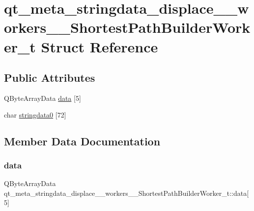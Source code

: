 \hypertarget{structqt__meta__stringdata__displace____workers_____shortest_path_builder_worker__t}{}\section{qt\+\_\+meta\+\_\+stringdata\+\_\+displace\+\_\+\+\_\+workers\+\_\+\+\_\+\+Shortest\+Path\+Builder\+Worker\+\_\+t Struct Reference}
\label{structqt__meta__stringdata__displace____workers_____shortest_path_builder_worker__t}
\subsection*{Public Attributes}
\begin{DoxyCompactItemize}
\item 
Q\+Byte\+Array\+Data \mbox{\hyperlink{structqt__meta__stringdata__displace____workers_____shortest_path_builder_worker__t_ae2e477a5eff7efb19b920f1423a9502b}{data}} \mbox{[}5\mbox{]}
\item 
char \mbox{\hyperlink{structqt__meta__stringdata__displace____workers_____shortest_path_builder_worker__t_ac002718e81bdd1b20b63ef0a81c2f5f8}{stringdata0}} \mbox{[}72\mbox{]}
\end{DoxyCompactItemize}


\subsection{Member Data Documentation}
\mbox{\label{structqt__meta__stringdata__displace____workers_____shortest_path_builder_worker__t_ae2e477a5eff7efb19b920f1423a9502b}} 
\subsubsection{\texorpdfstring{data}{data}}
{\footnotesize\ttfamily Q\+Byte\+Array\+Data qt\+\_\+meta\+\_\+stringdata\+\_\+displace\+\_\+\+\_\+workers\+\_\+\+\_\+\+Shortest\+Path\+Builder\+Worker\+\_\+t\+::data\mbox{[}5\mbox{]}}

